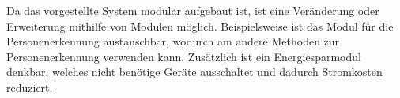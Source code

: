 Da das vorgestellte System modular aufgebaut ist, ist eine Veränderung oder Erweiterung mithilfe von Modulen möglich.
Beispielsweise ist das Modul für die Personenerkennung austauschbar, wodurch am andere Methoden zur Personenerkennung verwenden kann.
Zusätzlich ist ein Energiesparmodul denkbar, welches nicht benötige Geräte ausschaltet und dadurch Stromkosten reduziert.

